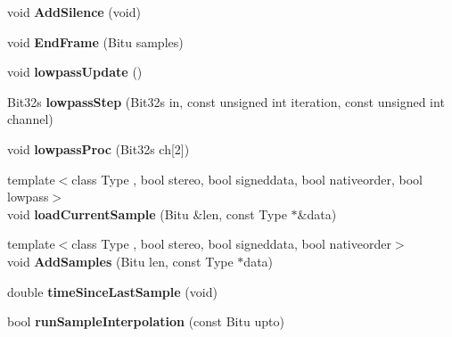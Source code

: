 \begin{DoxyCompactItemize}
\item 
\hypertarget{classMixerChannel_afa28eba1c36e5bc5bcea638d13908ae1}{void {\bfseries Add\-Silence} (void)}\label{classMixerChannel_afa28eba1c36e5bc5bcea638d13908ae1}

\item 
\hypertarget{classMixerChannel_ac4912fcd7fdb31df56fc9f65ff517265}{void {\bfseries End\-Frame} (Bitu samples)}\label{classMixerChannel_ac4912fcd7fdb31df56fc9f65ff517265}

\item 
\hypertarget{classMixerChannel_a701ff1e9c1e386b040bc43f09b6efa20}{void {\bfseries lowpass\-Update} ()}\label{classMixerChannel_a701ff1e9c1e386b040bc43f09b6efa20}

\item 
\hypertarget{classMixerChannel_aaf27dd44013a941fcb2e2f8ff529d2a8}{Bit32s {\bfseries lowpass\-Step} (Bit32s in, const unsigned int iteration, const unsigned int channel)}\label{classMixerChannel_aaf27dd44013a941fcb2e2f8ff529d2a8}

\item 
\hypertarget{classMixerChannel_abe3d32baaf2d7a1e158691b66c3cd263}{void {\bfseries lowpass\-Proc} (Bit32s ch\mbox{[}2\mbox{]})}\label{classMixerChannel_abe3d32baaf2d7a1e158691b66c3cd263}

\item 
\hypertarget{classMixerChannel_ad8f9238e83e1806b369d0d0aa15e6ea9}{{\footnotesize template$<$class Type , bool stereo, bool signeddata, bool nativeorder, bool lowpass$>$ }\\void {\bfseries load\-Current\-Sample} (Bitu \&len, const Type $\ast$\&data)}\label{classMixerChannel_ad8f9238e83e1806b369d0d0aa15e6ea9}

\item 
\hypertarget{classMixerChannel_a4bfb1a6ad50d4c9a04a212b731cba7b4}{{\footnotesize template$<$class Type , bool stereo, bool signeddata, bool nativeorder$>$ }\\void {\bfseries Add\-Samples} (Bitu len, const Type $\ast$data)}\label{classMixerChannel_a4bfb1a6ad50d4c9a04a212b731cba7b4}

\item 
\hypertarget{classMixerChannel_acb6fa64394aefc3ae210c5716c25cfe2}{double {\bfseries time\-Since\-Last\-Sample} (void)}\label{classMixerChannel_acb6fa64394aefc3ae210c5716c25cfe2}

\item 
\hypertarget{classMixerChannel_a6a89abb0d5dafa7cb26b1278ea2ab1ee}{bool {\bfseries run\-Sample\-Interpolation} (const Bitu upto)}\label{classMixerChannel_a6a89abb0d5dafa7cb26b1278ea2ab1ee}


\end{DoxyCompactItemize}
